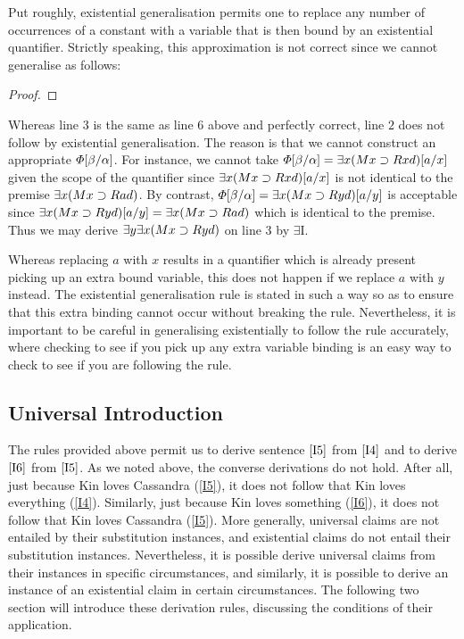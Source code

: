 Put roughly, existential generalisation permits one to replace any number of occurrences of a constant with a variable that is then bound by an existential quantifier.
Strictly speaking, this approximation is not correct since we cannot generalise as follows:

\begin{proof}
	 \pr{}
   
	 
\end{proof}

Whereas line $3$ is the same as line $6$ above and perfectly correct, line $2$ does not follow by existential generalisation.
The reason is that we cannot construct an appropriate $\varPhi[\beta/\alpha]$.
For instance, we cannot take $\varPhi[\beta/\alpha]=\exists x(Mx \supset Rxd)[a/x]$ given the scope of the quantifier since $\exists x(Mx \supset Rxd)[a/x]$ is not identical to the premise $\exists x(Mx \supset Rad)$.
By contrast, $\varPhi[\beta/\alpha]=\exists x(Mx \supset Ryd)[a/y]$ is acceptable since $\exists x(Mx \supset Ryd)[a/y]=\exists x(Mx \supset Rad)$ which is identical to the premise.
Thus we may derive $\exists y\exists x(Mx \supset Ryd)$ on line $3$ by $\exists$I.

Whereas replacing $a$ with $x$ results in a quantifier which is already present picking up an extra bound variable, this does not happen if we replace $a$ with $y$ instead. 
The existential generalisation rule is stated in such a way so as to ensure that this extra binding cannot occur without breaking the rule.
Nevertheless, it is important to be careful in generalising existentially to follow the rule accurately, where checking to see if you pick up any extra variable binding is an easy way to check to see if you are following the rule.




\subsection{Universal Introduction}
  \label{sec:UniIntro}

The rules provided above permit us to derive sentence $\ref{I5}$ from $\ref{I4}$ and to derive $\ref{I6}$ from $\ref{I5}$.
As we noted above, the converse derivations do not hold.
After all, just because Kin loves Cassandra (\ref{I5}), it does not follow that Kin loves everything (\ref{I4}).
Similarly, just because Kin loves something (\ref{I6}), it does not follow that Kin loves Cassandra (\ref{I5}).
More generally, universal claims are not entailed by their substitution instances, and existential claims do not entail their substitution instances.
Nevertheless, it is possible derive universal claims from their instances in specific circumstances, and similarly, it is possible to derive an instance of an existential claim in certain circumstances.
The following two section will introduce these derivation rules, discussing the conditions of their application.

